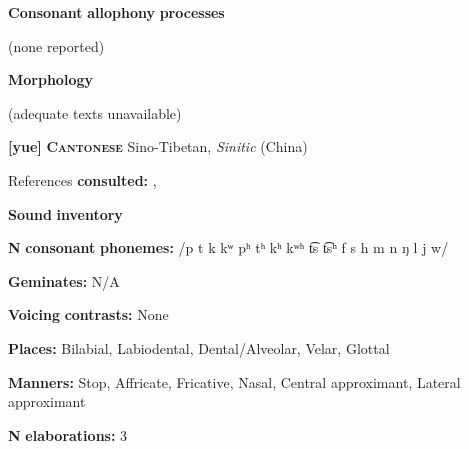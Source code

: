\documentclass[output=paper]{langsci/langscibook}
\begin{document}
\begin{styleBody}
\textbf{Consonant} \textbf{allophony} \textbf{processes}
\end{styleBody}

\begin{styleBody}
(none reported) 
\end{styleBody}

\begin{styleBody}
\textbf{Morphology}
\end{styleBody}

\begin{styleBody}
(adequate texts unavailable)
\end{styleBody}

\begin{styleBody}
\textbf{[yue]}   \textbf{\textsc{Cantonese}}  Sino-Tibetan, \textit{Sinitic} (China)
\end{styleBody}

\begin{styleBody}
References \textbf{consulted:} \citet{BauerBenedict1997}, \citet{MatthewsYip1994}
\end{styleBody}

\begin{styleBody}
\textbf{Sound} \textbf{inventory}
\end{styleBody}

\begin{styleBody}
\textbf{N} \textbf{consonant} \textbf{phonemes:} /p t k kʷ pʰ tʰ kʰ kʷʰ t͡s t͡sʰ f s h m n ŋ l j w/
\end{styleBody}

\begin{styleBody}
\textbf{Geminates:} N/A
\end{styleBody}

\begin{styleBody}
\textbf{Voicing} \textbf{contrasts:} None
\end{styleBody}

\begin{styleBody}
\textbf{Places:} Bilabial, Labiodental, Dental/Alveolar, Velar, Glottal
\end{styleBody}

\begin{styleBody}
\textbf{Manners:} Stop, Affricate, Fricative, Nasal, Central approximant, Lateral approximant
\end{styleBody}

\begin{styleBody}
\textbf{N} \textbf{elaborations:} 3
\end{styleBody}
\end{document}
